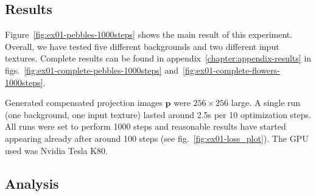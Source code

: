 \subsection{Results}
\label{section:results-experiments-01-results}

Figure~\ref{fig:ex01-pebbles-1000steps} shows the main result of this experiment. Overall, we have tested five different backgrounds and two different input textures. Complete results can be found in appendix~\ref{chapter:appendix-results} in figs.~\ref{fig:ex01-complete-pebbles-1000steps} and~\ref{fig:ex01-complete-flowers-1000steps}.

Generated compensated projection images \(\bm{p}\) were \(256 \times 256\) large. A single run (one background, one input texture) lasted around 2.5s per 10 optimization steps. All runs were set to perform 1000 steps and reasonable results have started appearing already after around 100 steps (see fig.~\ref{fig:ex01-loss_plot}). The GPU used was Nvidia Tesla K80.

\subsection{Analysis}
\label{section:results-experiments-01-analysis}

